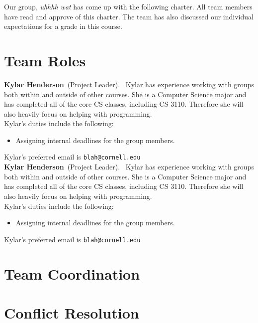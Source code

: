 \documentclass[letterpaper,11pt]{texMemo} %
\newcommand{\teamname}{uhhhh wat}
\newcommand{\teammember}[2]{ \textbf{#1}\ (#2).\ }
\newenvironment{duties}[1]
               {
                 #1's duties include the following:
                 \begin{itemize}
               }
               {
                 \end{itemize}
               }
\newcommand{\preferredemail}[2]{#1's preferred email is \texttt{#2}\\}
\begin{document}
\maketitle %


Our group, \textit{\teamname} has come up with the following charter.
All team members have read and approve of this charter. The team has also
discussed our individual expectations for a grade in this course.

\section*{Team Roles}
\teammember{Kylar Henderson}{Project Leader} Kylar has experience working
with groups both within and outside of other courses. She is a Computer Science
major and has completed all of the core CS classes, including CS 3110.
Therefore she will also heavily focus on helping with programming. \\
\begin{duties}{Kylar}
  \item Assigning internal deadlines for the group members.
\end{duties}
\preferredemail{Kylar}{blah@cornell.edu}

\teammember{Kylar Henderson}{Project Leader} Kylar has experience working
with groups both within and outside of other courses. She is a Computer Science
major and has completed all of the core CS classes, including CS 3110.
Therefore she will also heavily focus on helping with programming. \\
\begin{duties}{Kylar}
  \item Assigning internal deadlines for the group members.
\end{duties}
\preferredemail{Kylar}{blah@cornell.edu}

\section*{Team Coordination}

\section*{Conflict Resolution}

\end{document}
